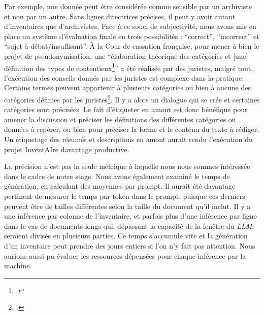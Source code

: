 Par exemple, une donnée peut être considérée comme sensible par un archiviste et non par un autre.
Sans lignes directrices précises, il peut y avoir autant d'inventaires que d'archivistes. Face à ce souci de subjectivité, nous avons 
mis en place un système d'évaluation finale en trois possibilités : \enquote{correct}, \enquote{incorrect} et \enquote{sujet à débat/insuffisant}.
À la Cour de cassation française, pour mener à bien le
 projet de pseudonymisation, une \enquote{élaboration théorique des catégories et [une] définition des types de contentieux\footcite{girard-chanudet_travail_2023}} a été réalisée par des juristes, malgré tout, l'exécution 
 des conseils donnés par les juristes est complexe dans la pratique. Certains termes peuvent appartenir à plusieurs catégories
 ou bien à aucune des catégories définies par les juristes\footcite{girard-chanudet_travail_2023}. Il y a alors un dialogue qui se crée et 
 certaines catégories sont précisées. Le fait d'étiqueter en amont est donc bénéfique pour amener la discussion et préciser les définitions
 des différentes catégories ou données à repérer, ou bien pour préciser la forme et le contenu du texte à rédiger.
 Un étiquetage des résumés et descriptions en amont aurait rendu l'exécution du projet InventAIre davantage productive.


La précision n'est pas la seule métrique à laquelle nous nous sommes intéressée dans le cadre de notre stage.
Nous avons également examiné le temps de génération, en calculant des moyennes par \gls{prompt}. Il aurait été davantage pertinent de mesurer le temps par \gls{token}
dans le prompt, puisque ces derniers peuvent être de tailles différentes selon la taille du document qu'il inclut.
Il y a une inférence par colonne de l'inventaire, et parfois plus d'une inférence par ligne dans le cas de documents longs qui, dépassant la capacité de la \gls{fenêtre} du \emph{LLM}, seraient divisés en plusieurs parties.
Ce temps s'accumule vite et la génération d'un inventaire peut prendre des jours entiers si l'on n'y fait pas attention. Nous aurions aussi pu évaluer les ressources dépensées pour chaque inférence par la machine.

